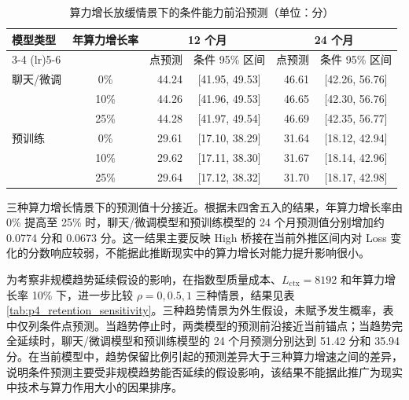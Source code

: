 \documentclass[bwprint]{gmcmthesis}
\numberwithin{equation}{section}
\numberwithin{figure}{section}
\numberwithin{table}{section}
\begin{document}
        \begin{table}[H]
            \centering
            \caption{算力增长放缓情景下的条件能力前沿预测（单位：分）}
            \label{tab:p4_forecast}
            \small
            \setlength{\tabcolsep}{4pt}
            \renewcommand{\arraystretch}{1.15}
            \begin{tabular}{@{}lcrcrc@{}}
                \toprule
                模型类型 & 年算力增长率 & \multicolumn{2}{c}{12 个月} & \multicolumn{2}{c}{24 个月} \\
                \cmidrule(lr){3-4}
                \cmidrule(lr){5-6}
                & & 点预测 & 条件 95\% 区间 & 点预测 & 条件 95\% 区间 \\
                \midrule
                聊天/微调 & 0\%  & 44.24 & [41.95, 49.53] & 46.61 & [42.26, 56.76] \\
                          & 10\% & 44.26 & [41.96, 49.53] & 46.65 & [42.30, 56.76] \\
                          & 25\% & 44.28 & [41.97, 49.54] & 46.69 & [42.35, 56.77] \\
                \midrule
                预训练    & 0\%  & 29.61 & [17.10, 38.29] & 31.64 & [18.12, 42.94] \\
                          & 10\% & 29.62 & [17.11, 38.30] & 31.67 & [18.14, 42.96] \\
                          & 25\% & 29.64 & [17.12, 38.32] & 31.70 & [18.17, 42.98] \\
                \bottomrule
            \end{tabular}
        \end{table}

        三种算力增长情景下的预测值十分接近。根据未四舍五入的结果，年算力增长率由 0\% 提高至 25\% 时，聊天/微调模型和预训练模型的 24 个月预测值分别增加约 0.0774 分和 0.0673 分。这一结果主要反映 High 桥接在当前外推区间内对 Loss 变化的分数响应较弱，不能据此推断现实中的算力增长对能力提升影响很小。

        为考察非规模趋势延续假设的影响，在指数型质量成本、$L_{\mathrm{ctx}}=8192$ 和年算力增长率 10\% 下，进一步比较 $\rho=0,0.5,1$ 三种情景，结果见表\ref{tab:p4_retention_sensitivity}。三种趋势情景为外生假设，未赋予发生概率，表中仅列条件点预测。当趋势停止时，两类模型的预测前沿接近当前锚点；当趋势完全延续时，聊天/微调模型和预训练模型的 24 个月预测分别达到 51.42 分和 35.94 分。在当前模型中，趋势保留比例引起的预测差异大于三种算力增速之间的差异，说明条件预测主要受非规模趋势能否延续的假设影响，该结果不能据此推广为现实中技术与算力作用大小的因果排序。
\end{document}

